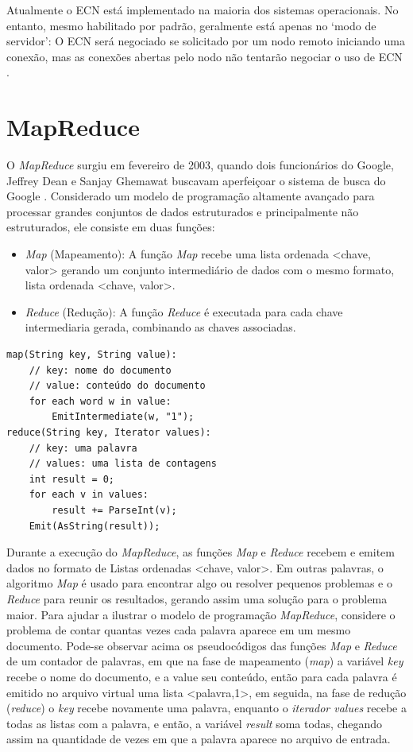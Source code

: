 Atualmente o ECN está implementado na maioria dos sistemas operacionais. No entanto, mesmo habilitado por padrão, geralmente está apenas no `modo de servidor': O ECN será negociado se solicitado por um nodo remoto iniciando uma conexão, mas as conexões abertas pelo nodo não tentarão negociar o uso de ECN \cite{kuhlewind2013state}.

\section{MapReduce}

O \emph{MapReduce} surgiu em fevereiro de 2003, quando dois funcionários do Google, Jeffrey Dean e Sanjay Ghemawat buscavam aperfeiçoar o sistema de busca do Google \cite{dean2004mapreduce}. Considerado um modelo de programação altamente avançado para processar grandes conjuntos de dados estruturados e principalmente não estruturados, ele consiste em duas funções:

\begin{itemize}
    \item \emph{Map} (Mapeamento): A função \emph{Map} recebe uma lista ordenada <chave, valor> gerando um conjunto intermediário de dados com o mesmo formato, lista ordenada <chave, valor>.
    \item \emph{Reduce} (Redução): A função \emph{Reduce} é executada para cada chave intermediaria gerada, combinando as chaves associadas.
\end{itemize}


\begin{lstlisting}
map(String key, String value):
	// key: nome do documento
	// value: conteúdo do documento
	for each word w in value:
		EmitIntermediate(w, "1");
reduce(String key, Iterator values):
	// key: uma palavra
	// values: uma lista de contagens
	int result = 0;
	for each v in values:
		result += ParseInt(v);
	Emit(AsString(result)); 
\end{lstlisting}


Durante a execução do \emph{MapReduce}, as funções \emph{Map} e \emph{Reduce} recebem e emitem dados no formato de Listas ordenadas <chave, valor>. Em outras palavras, o algoritmo \emph{Map} é usado para encontrar algo ou resolver pequenos problemas e o \emph{Reduce} para reunir os resultados, gerando assim uma solução para o problema maior. Para ajudar a ilustrar o modelo de programação \emph{MapReduce}, considere o problema de contar quantas vezes cada palavra aparece em um mesmo documento. Pode-se observar acima os pseudocódigos das funções \emph{Map} e \emph{Reduce} de um contador de palavras, em que na fase de mapeamento (\emph{map}) a variável \emph{key} recebe o nome do documento, e a value seu conteúdo, então para cada palavra é emitido no arquivo virtual uma lista <palavra,1>, em seguida, na fase de redução (\emph{reduce}) o \emph{key} recebe novamente uma palavra, enquanto o \emph{iterador values} recebe a todas as listas com a palavra, e então, a variável \emph{result} soma todas, chegando assim na quantidade de vezes em que a palavra aparece no arquivo de entrada.

